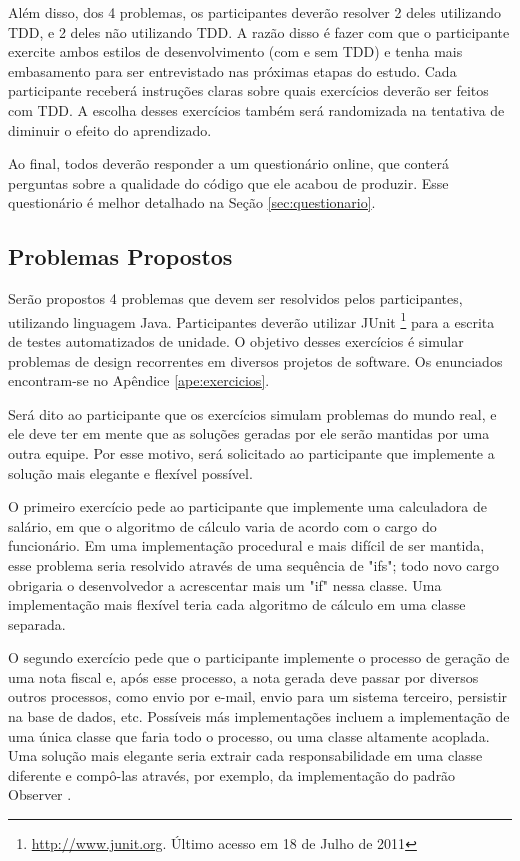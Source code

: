 Além disso, dos 4 problemas, os participantes
deverão resolver 2 deles utilizando TDD, e 2 deles não utilizando TDD. A razão disso
é fazer com que o participante exercite ambos estilos de desenvolvimento (com e sem TDD)
e tenha mais embasamento para ser entrevistado nas próximas etapas do estudo. 
Cada participante receberá instruções claras sobre quais exercícios deverão ser feitos
com TDD. A escolha desses exercícios também será randomizada na tentativa de diminuir
o efeito do aprendizado.

Ao final, todos deverão responder a um questionário online, 
que conterá perguntas sobre a qualidade
do código que ele acabou de produzir. Esse questionário
é melhor detalhado na Seção \ref{sec:questionario}.

\subsection{Problemas Propostos}
\label{sec:exercicios}

Serão propostos 4 problemas que devem ser resolvidos pelos participantes, utilizando
linguagem Java. Participantes deverão utilizar JUnit \footnote{\url{http://www.junit.org}. 
Último acesso em 18 de Julho de 2011} para a escrita de testes
automatizados de unidade. O objetivo desses exercícios é simular problemas de design 
recorrentes em diversos projetos de software. Os enunciados encontram-se no Apêndice 
\ref{ape:exercicios}.

Será dito ao participante que os exercícios simulam problemas do mundo real, e ele deve
ter em mente que as soluções geradas por ele serão mantidas por uma outra equipe.
Por esse motivo, será solicitado ao participante que implemente a solução mais elegante e flexível 
possível.

O primeiro exercício pede ao participante que implemente uma calculadora de salário, em que
o algoritmo de cálculo varia de acordo com o cargo do funcionário. Em uma implementação
procedural e mais difícil de ser mantida, esse problema seria resolvido através de uma
sequência de "ifs"; todo novo cargo obrigaria o desenvolvedor a acrescentar mais um "if" 
nessa classe. Uma implementação mais flexível teria cada algoritmo de cálculo em uma 
classe separada.

O segundo exercício pede que o participante implemente o processo de geração de uma nota fiscal e, após
esse processo, a nota gerada deve passar por diversos outros processos, como envio por e-mail, envio
para um sistema terceiro, persistir na base de dados, etc. Possíveis más implementações incluem a 
implementação de uma única classe que faria todo o processo, ou uma classe altamente acoplada.
Uma solução mais elegante seria extrair cada responsabilidade em uma classe diferente e compô-las
através, por exemplo, da implementação do padrão Observer \cite{gof}.

